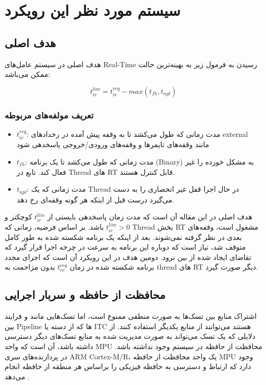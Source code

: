 \documentclass[10pt, a4paper]{article}
\begin{document}
\section{سیستم مورد نظر این رویکرد}

\subsection{هدف اصلی}

هدف اصلی در سیستم عامل‌های Real-Time رسیدن به فرمول زیر به بهینه‌ترین حالت ممکن می‌باشد:

\begin{equation}
    t^{lim}_{ir} = t^{req}_{ir} - max(t_{fh}, t_{npl})
\end{equation}

\subsubsection{تعریف مولفه‌های مربوطه}

\begin{itemize}
    \item $t^{req}_{ir}$: مدت زمانی که طول می‌کشد تا به وقفه پیش آمده در
    رخداد‌های external مانند وقفه‌های تایمرها و وقفه‌های ورودی/خروجی پاسخدهی شود
    \item $t_{fh}$: مدت زمانی که طول می‌کشد تا  یک برنامه
    (Binary) به مشکل خورده را غیر فعال کند. تابع  در Thread
    های RT قابل کنترل هستند.
    \item $t_{npl}$: مدت زمانی که یک Thread در حال اجرا قفل غیر انحصاری را به
    دست می‌گیرد درست قبل از اینکه هر گونه وقفه‌ای رخ دهد.
\end{itemize}

هدف اصلی در این مقاله آن است که مدت زمان پاسخدهی بایستی از $t^{lim}_{ir}$ کوچکتر
و $t^{lim}_{ir} > 0$ باشد. بر اساس فرضیه، زمانی که Thread بخش RT مشغول است،
وقفه‌های بعدی در نظر گرفته نمی‌شوند. بعد از اینکه یک برنامه شکسته شده به طور
کامل متوقف شد، نیاز است که دوباره این برنامه به سرعت در چرخه اجرا قرار گیرد که
تقاضای ایجاد شده از بین نرود. دومین هدف در این رویکرد آن است که اجرای مجدد
برنامه شکسته شده در زمان $t^{req}_{re}$ بدون مزاحمت به thread های RT دیگر صورت
گیرد.

\subsection{محافظت از حافظه و سربار اجرایی}

اشتراک منابع بین تسک‌ها به صورت منطقی ممنوع است، اما تسک‌هایی مانند  و فرایند بین Pipeline ها که از دسته  یا ITC
هستند می‌توانند از منابع یکدیگر استفاده کنند. از دلایلی که یک تسک می‌تواند به
صورت مدیریت شده به منابع تسک‌های دیگر دسترسی داشته باشد، آن است که واحد MPU
محافظت از حافظه در سیستم وجود نداشته باشد. در پردازنده‌های سری ARM Cortex-M/R،
یک واحد محافظت از حافظه MPU وجود دارد که ارتباط و دسترسی به حافظه فیزیکی را
براساس هر منطقه از حافظه انجام می‌دهد \cite{cortexm4arm}.
\end{document}
